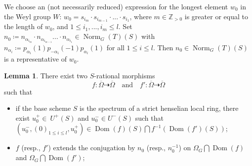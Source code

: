 \documentclass[11pt, reqno]{amsart}
\theoremstyle{plain}
\theoremstyle{definition}
\newtheorem{lemma}[theorem]{Lemma}
\DeclareMathOperator{\Dom}{Dom} %
\DeclareMathOperator{\Norm}{Norm}	%
\begin{document}
We choose an (not necessarily reduced) expression for the longest element $w_0$ in the Weyl group $W$: $w_0=s_{i_m}\cdot s_{i_{m-1}}\cdot...\cdot s_{i_1}$, where $m\in\mathbb{Z}_{>0}$ is greater or equal to the length of $w_0$, and $1 \leq i_1,..., i_m\leq l$. Set $n_0\coloneq n_{\alpha_{i_m}}\cdot n_{\alpha_{i_{m-1}}}...\cdot n_{\alpha_{i_1}}\in\Norm_G(T)(S)$ with $n_{\alpha_i}\coloneq p_{\alpha_i}(1)p_{-\alpha_i}(-1)p_{\alpha_i}(1)$ for all $1\leq i\leq l$. Then $n_0\in\Norm_G(T)(S)$ is a representative of $w_0$.

\begin{lemma}\label{w_0invariantsub}
    There exist two $S$-rational morphisms
    $$f\colon \overline{\Omega}\dashrightarrow \overline{\Omega}\quad\text{and} \quad f'\colon \overline{\Omega}\dashrightarrow \overline{\Omega}$$
    such that
    \begin{itemize}  
    \item[(1)] if the base scheme $S$ is the spectrum of a strict henselian local ring, there exist $u_0^+\in ~U^+(S)$ and $u_0^-\in U^-(S)$ such that $(u_0^-, (0)_{1\leq i\leq l}, u_0^+)\in \Dom(f)(S)\bigcap f^{-1}(\Dom(f')(S))$;
    
    \item[(2)] $f$ (resp., $f'$) extends the conjugation by $n_0$ (resp., $n_0^{-1}$) on $\Omega_G\bigcap \Dom(f)$ and $\Omega_G\bigcap \Dom(f')$;          
    \end{itemize}
\end{lemma}
\end{document}
